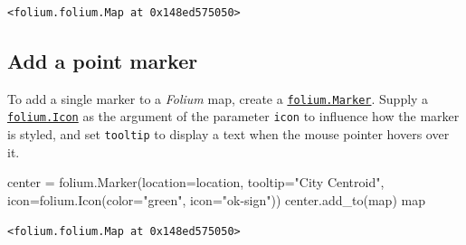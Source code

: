 \documentclass[
  letterpaper,
  DIV=11,
  numbers=noendperiod]{scrreprt}
\newenvironment{Shaded}{\begin{snugshade}}{\end{snugshade}}
\newcommand{\BuiltInTok}[1]{\textcolor[rgb]{0.00,0.23,0.31}{#1}}
\newcommand{\NormalTok}[1]{\textcolor[rgb]{0.00,0.23,0.31}{#1}}
\newcommand{\OperatorTok}[1]{\textcolor[rgb]{0.37,0.37,0.37}{#1}}
\newcommand{\StringTok}[1]{\textcolor[rgb]{0.13,0.47,0.30}{#1}}
\begin{document}
\begin{verbatim}
<folium.folium.Map at 0x148ed575050>
\end{verbatim}

\hypertarget{add-a-point-marker}{%
\subsection{Add a point marker}\label{add-a-point-marker}}

To add a single marker to a \emph{Folium} map, create a
\href{https://python-visualization.github.io/folium/modules.html\#folium.map.Marker}{\texttt{folium.Marker}}.
Supply a
\href{https://python-visualization.github.io/folium/modules.html\#folium.map.Icon}{\texttt{folium.Icon}}
as the argument of the parameter \texttt{icon} to influence how the
marker is styled, and set \texttt{tooltip} to display a text when the
mouse pointer hovers over it.

\begin{Shaded}
\begin{Highlighting}[]
\NormalTok{center }\OperatorTok{=}\NormalTok{ folium.Marker(location}\OperatorTok{=}\NormalTok{location, tooltip}\OperatorTok{=}\StringTok{"City Centroid"}\NormalTok{, icon}\OperatorTok{=}\NormalTok{folium.Icon(color}\OperatorTok{=}\StringTok{"green"}\NormalTok{, icon}\OperatorTok{=}\StringTok{"ok{-}sign"}\NormalTok{))}
\NormalTok{center.add\_to(}\BuiltInTok{map}\NormalTok{)}
\BuiltInTok{map}
\end{Highlighting}
\end{Shaded}

\begin{verbatim}
<folium.folium.Map at 0x148ed575050>
\end{verbatim}
\end{document}
